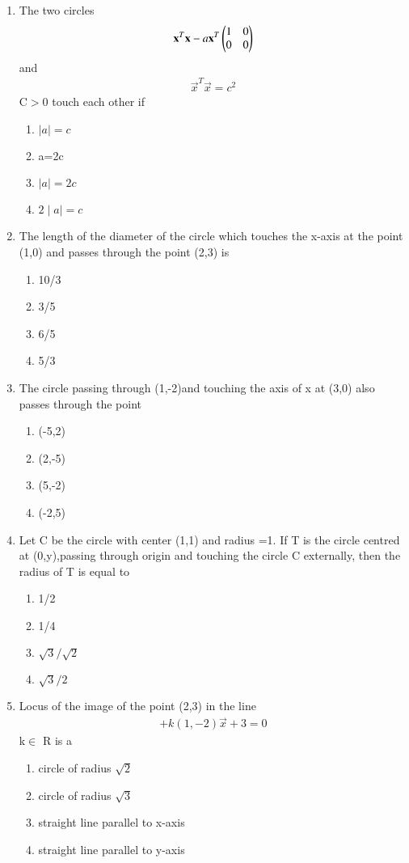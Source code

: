 \begin{enumerate}[label=\arabic*.,ref=\thesubsection.\theenumi]
\item The two circles 
\begin{align}
\mathbf x^T\mathbf x-a\mathbf x^T\begin{pmatrix}1 & 0 \\ 0 & 0\end{pmatrix}
\end{align} 
and 
\begin{align}
\vec x^T\vec x=c^2
\end{align} 
C$>$0 
touch each other if
\begin{enumerate}    
\item $\mid a\mid=c$
\item a=2c
\item $\mid a\mid=2c$
\item $2\mid a\mid=c$
\end{enumerate}
     
\item The length of the diameter of the circle which touches the x-axis at the point (1,0) and passes through the point (2,3) is
\begin{enumerate}    
\item 10/3
\item 3/5
\item 6/5
\item 5/3
\end{enumerate}

\item The circle passing through (1,-2)and touching the axis of x at (3,0) also passes through the point
\begin{enumerate}    
\item (-5,2)
\item (2,-5)
\item (5,-2)
\item (-2,5)
\end{enumerate}

\item Let C be the circle with center (1,1) and radius =1. If T is the circle centred at (0,y),passing through origin and touching the circle C externally, then the radius of T is equal to
\begin{enumerate}
\item 1/2
\item 1/4
\item $\sqrt{3}/\sqrt{2}$
\item $\sqrt{3}/2$
\end{enumerate}
     
\item Locus of the image of the point (2,3) in the line 		  	
\begin{align}
[\myvec{2&-3}\vec{x}+4]+k(1,-2)\vec{x}+3=0
\end{align} 
k$\in$ R is a
\begin{enumerate}
\item circle of radius $\sqrt{2}$
\item circle of radius $\sqrt{3}$
\item straight line parallel to x-axis
\item straight line parallel to y-axis
\end{enumerate}


\end{enumerate}
